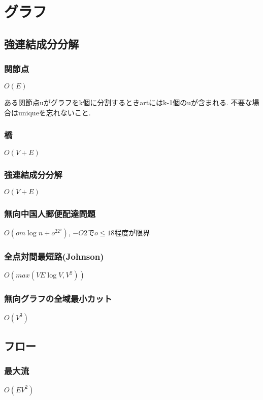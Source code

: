 
\section{グラフ}

\subsection{強連結成分分解}
\subsubsection{関節点}
$O(E)$\par
ある関節点uがグラフをk個に分割するときartにはk-1個のuが含まれる. 不要な場合はuniqueを忘れないこと.\par


\subsubsection{橋}
$O(V+E)$\par


\subsubsection{強連結成分分解}
$O(V+E)$\par


\subsubsection{無向中国人郵便配達問題}
$O(om\log n+o^22^o)$, $-O2$で$o\leq 18$程度が限界

\subsubsection{全点対間最短路(Johnson)}
$O(max(VE\log V, V^2))$

\subsubsection{無向グラフの全域最小カット}
$O(V^3)$


\subsection{フロー}
\subsubsection{最大流}
$O(EV^2)$\par



